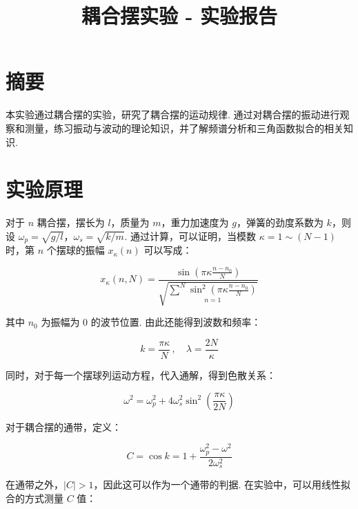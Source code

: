 \documentclass{customDoc}
\begin{document}
\title{耦合摆实验 - 实验报告}

\vspace{-20pt}

\maketitle

\section{摘要}

本实验通过耦合摆的实验，研究了耦合摆的运动规律. 通过对耦合摆的振动进行观察和测量，练习振动与波动的理论知识，并了解频谱分析和三角函数拟合的相关知识.

\section{实验原理}

对于 $n$ 耦合摆，摆长为 $l$，质量为 $m$，重力加速度为 $g$，弹簧的劲度系数为 $k$，则设 $\omega_p = \sqrt{g/l}$，$\omega_s = \sqrt{k/m}$. 通过计算，可以证明，当模数 $\kappa = 1\sim(N - 1)$ 时，第 $n$ 个摆球的振幅 $x_\kappa(n)$ 可以写成：

\begin{equation}
    x_\kappa(n,N) = \frac{\sin\left(\pi\kappa\frac{n - n_0}{N}\right)}{\sqrt{\underset{n = 1}{\overset{N}{\sum}\sin^2\left(\pi\kappa\frac{n - n_0}{N}\right)}}}
\end{equation}

其中 $n_0$ 为振幅为 $0$ 的波节位置. 由此还能得到波数和频率：

\begin{equation}
    k = \frac{\pi\kappa}{N}\,,\quad\lambda = \frac{2N}{\kappa}
\end{equation}

同时，对于每一个摆球列运动方程，代入通解，得到色散关系：

\begin{equation}
    \omega^2 = \omega_p^2 + 4\omega_s^2\sin^2\left(\frac{\pi\kappa}{2N}\right)
\end{equation}

对于耦合摆的通带，定义：

\begin{equation}
    C = \cos k = 1 + \frac{\omega_p^2-\omega^2}{2\omega_s^2}\label{C}
\end{equation}

在通带之外，$|C|>1$，因此这可以作为一个通带的判据. 在实验中，可以用线性拟合的方式测量 $C$ 值：
\end{document}
